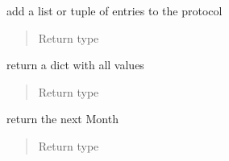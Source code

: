 \documentclass[letterpaper,10pt,english]{sphinxmanual}
\begin{document}
\begin{fulllineitems}
\begin{fulllineitems}
\end{fulllineitems}


\begin{fulllineitems}
\label{\detokenize{devmanual:protocol.Month.append_protocol}}
add a list or tuple of entries to the protocol
\begin{quote}\begin{description}
\item[{Return type}] \leavevmode
{\hyperref[\detokenize{devmanual:protocol.Month}]{}}

\end{description}\end{quote}

\end{fulllineitems}


\begin{fulllineitems}
\label{\detokenize{devmanual:protocol.Month.dump}}
return a dict with all values
\begin{quote}\begin{description}
\item[{Return type}] \leavevmode
{}

\end{description}\end{quote}

\end{fulllineitems}


\begin{fulllineitems}
\label{\detokenize{devmanual:protocol.Month.get_next}}
return the next Month
\begin{quote}\begin{description}
\item[{Return type}] \leavevmode
{\hyperref[\detokenize{devmanual:protocol.Month}]{}}

\end{description}\end{quote}


\end{fulllineitems}
\end{fulllineitems}
\end{document}
